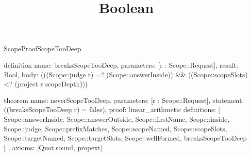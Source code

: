 \begin{lexlean}{ScopeProofScopeTooDeep}
\title{Boolean}
\begin{semanticmodule}
definition{
  name: breaksScopeTooDeep,
  parameters: [r : Scope::Request],
  result: Bool,
  body: (((Scope::judge r) =? (Scope::answerInside)) && ((Scope::scopeSlots) <? (project r scopeDepth)))
}

theorem{
  name: neverScopeTooDeep,
  parameters: [r : Scope::Request],
  statement: ((breaksScopeTooDeep r) = false),
  proof: linear_arithmetic{
    definitions: [
      Scope::answerInside,
      Scope::answerOutside,
      Scope::firstName,
      Scope::inside,
      Scope::judge,
      Scope::prefixMatches,
      Scope::scopeNamed,
      Scope::scopeSlots,
      Scope::targetNamed,
      Scope::targetSlots,
      Scope::wellFormed,
      breaksScopeTooDeep
    ]
  },
  axioms: [Quot.sound, propext]
}
\end{semanticmodule}
\end{lexlean}
